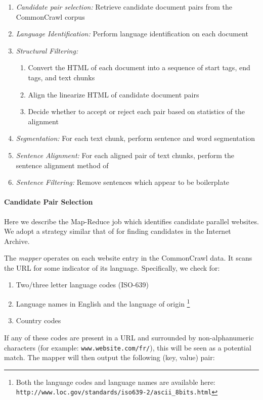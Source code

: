 \begin{enumerate}
\item {\em Candidate pair selection:} Retrieve candidate document pairs from the
CommonCrawl corpus
\item {\em Language Identification:} Perform language identification on each
document
\item {\em Structural Filtering:}
  \begin{enumerate}
  \item Convert the HTML of each document into a sequence of start tags, end tags,
  and text chunks
  \item Align the linearize HTML of candidate document pairs
  \item Decide whether to accept or reject each pair based on statistics of the
  alignment
  \end{enumerate}
\item {\em Segmentation:} For each text chunk, perform sentence and word
segmentation
\item {\em Sentence Alignment:} For each aligned pair of text chunks, perform
the sentence alignment method of \citet{Gale93}
\item {\em Sentence Filtering:} Remove sentences which appear to be boilerplate
\label{enum:strand}
\end{enumerate}

\paragraph{Candidate Pair Selection}
Here we describe the Map-Reduce job which identifies candidate parallel
websites. We adopt a strategy similar that of \citet{Resnik03} for finding
candidates in the Internet Archive.

The {\em mapper} operates on each website entry in the CommonCrawl data. It
scans the URL for some indicator of its language. Specifically, we check for:

\begin{enumerate}
\item Two/three letter language codes (ISO-639)
\item Language names in English and the language of origin \footnote{Both
the language codes and language names are available here: {\tt
http://www.loc.gov/standards/iso639-2/ascii\_8bits.html}}
\item Country codes
\end{enumerate}

If any of these codes are present in a URL and surrounded by non-alphanumeric
characters (for example: {\tt www.website.com/fr/}), this will be seen as a
potential match. The mapper will then output the following (key, value) pair:

